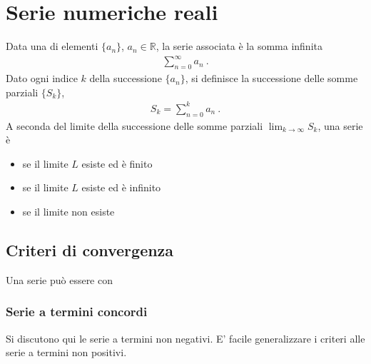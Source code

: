 \documentclass[letterpaper,10pt,english]{jupyterBook}
\begin{document}
\section{Serie numeriche reali}
\label{\detokenize{ch/series:serie-numeriche-reali}}
\sphinxAtStartPar
{} Data una  di elementi \(\{ a_n \}\), \(a_n \in \mathbb{R}\), la serie associata è la somma infinita
\begin{equation*}
\begin{split}\sum_{n=0}^{\infty} a_n \ .\end{split}
\end{equation*}
\sphinxAtStartPar
Dato ogni indice \(k\) della successione \(\{ a_n \}\), si definisce la successione delle somme parziali \(\{ S_k \}\),
\begin{equation*}
\begin{split}S_k = \sum_{n=0}^{k} a_n \ .\end{split}
\end{equation*}
\sphinxAtStartPar
{}
A seconda del limite della successione delle somme parziali \(\lim_{k \rightarrow \infty} S_k\), una serie è
\begin{itemize}
\item {} 
\sphinxAtStartPar
{} se il limite \(L\) esiste ed è finito

\item {} 
\sphinxAtStartPar
{} se il limite \(L\) esiste ed è infinito

\item {} 
\sphinxAtStartPar
{} se il limite non esiste

\end{itemize}


\subsection{Criteri di convergenza}
\label{\detokenize{ch/series:id1}}
\sphinxAtStartPar
Una serie può essere con


\subsubsection{Serie a termini concordi}
\label{\detokenize{ch/series:serie-a-termini-concordi}}
\sphinxAtStartPar
Si discutono qui le serie a termini non negativi. E’ facile generalizzare i criteri alle serie a termini non positivi.
\end{document}
